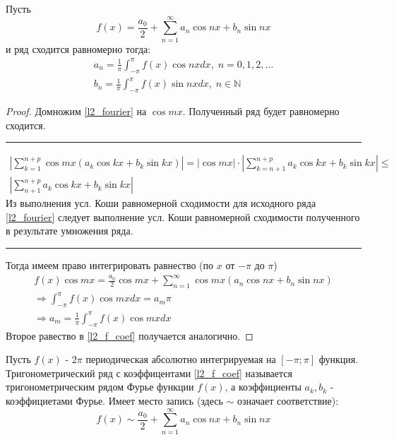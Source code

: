 \documentclass{article}
\newcommand\hr{
    \noindent\rule[0.5ex]{\linewidth}{0.5pt}
}
\theoremstyle{definition}
\numberwithin{theorem}{section}
\numberwithin{lemma}{section}
\numberwithin{definition}{section}
\numberwithin{corollary}{section}
\numberwithin{equation}{section}
\let\implies\Rightarrow
\begin{document}
\begin{lemma} \label{l2_f_lemma}
  Пусть
  \begin{equation} \label{l2_fourier}
    f(x)=\frac{a_0}{2}+\sum_{n=1}^{\infty}a_n\cos nx+b_n\sin nx
  \end{equation}
  и ряд сходится равномерно тогда:
  \begin{equation}
    \begin{gathered} \label{l2_f_coef}
      a_n=\frac{1}{\pi}\int_{-\pi}^{\pi}f(x)\cos nx dx, \; n=0,1,2,\dots \\ 
      b_n=\frac{1}{\pi}\int_{-\pi}^{\pi}f(x)\sin nx dx, \; n\in\mathbb{N} 
    \end{gathered}
  \end{equation}
\end{lemma}
\begin{proof}
  Домножим \ref{l2_fourier} на $\cos mx$. 
  Полученный ряд будет равномерно сходится.

  \hr
  \begin{gather*}
    \left|\sum_{k=1}^{n+p}\cos mx(a_k\cos kx + b_k \sin kx)\right|= 
    |\cos mx|\cdot\left|\sum_{k=n+1}^{n+p}a_k\cos kx + b_k\sin kx\right| \le  \\
    \left|\sum_{n+1}^{n+p}a_k\cos kx + b_k \sin kx\right|
  \end{gather*}
  Из выполнения усл. Коши равномерной сходимости для исходного ряда \ref{l2_fourier}
  следует выполнение усл. Коши равномерной сходимости полученного в результате умножения ряда.

  \hr
  Тогда имеем право интегрировать равнество (по $x$ от $-\pi$ до $\pi$)
  \begin{gather*}
    f(x)\cos mx = \frac{a_0}{2}\cos mx + \sum_{n=1}^{\infty}\cos mx (a_n \cos nx + b_n \sin nx) \\
    \implies \int_{-\pi}^{\pi}f(x)\cos mx dx = a_m \pi \\ 
    \implies a_m=\frac{1}{\pi}\int_{-\pi}^{\pi}f(x)\cos mx dx
  \end{gather*}
  Второе равество в \ref{l2_f_coef} получается аналогично.
\end{proof}
\begin{definition}
  Пусть $f(x)$ - $2\pi$ периодическая абсолютно интегрируемая на $[-\pi;\pi]$ функция.
  Тригонометрический ряд с коэффицентами \ref{l2_f_coef} называется
  тригонометрическим рядом Фурье функции $f(x)$, а коэффициенты $a_k,b_k$ - коэффициетами Фурье.
  Имеет место запись (здесь $\sim$ означает соответствие):
  \[
    f(x)\sim \frac{a_0}{2}+\sum_{n=1}^{\infty}a_n\cos nx + b_n\sin nx
  \]
\end{definition}
\end{document}

